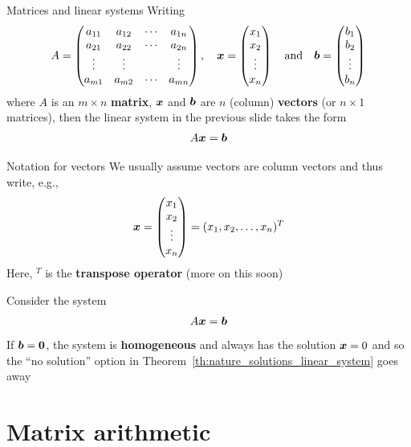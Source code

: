 \documentclass[aspectratio=169]{beamer}
\begin{document}
\begin{frame}{Matrices and linear systems}
Writing
$$
A=
\begin{pmatrix}
a_{11} & a_{12} & \cdots & a_{1n} \\
a_{21} & a_{22} & \cdots & a_{2n} \\
\vdots &\vdots & & \vdots \\
a_{m1} & a_{m2} & \cdots & a_{mn}
\end{pmatrix},\quad
\bm{x}=
\begin{pmatrix}
x_1\\ x_2 \\ \vdots \\ x_n
\end{pmatrix}
\quad\textrm{and}\quad
\bm{b}=
\begin{pmatrix}
b_1\\ b_2 \\ \vdots \\ b_n
\end{pmatrix}
$$
where $A$ is an $m\times n$ \textbf{matrix}, $\bm{x}$ and $\bm{b}$ are $n$ (column) \textbf{vectors} (or $n\times 1$ matrices), then the linear system in the previous slide takes the form
$$
A\bm{x}=\bm{b}  
$$
\end{frame}



\begin{frame}{Notation for vectors}
We usually assume vectors are column vectors and thus write, e.g.,
\[ 
\bm{x}=
\begin{pmatrix}
x_1\\ x_2 \\ \vdots \\ x_n
\end{pmatrix}
= (x_1,x_2,\ldots,x_n)^T
\]
Here, $^T$ is the \textbf{transpose operator} (more on this soon)
\end{frame}



\begin{frame}
Consider the system
\[
A\bm{x}=\bm{b}
\]
\vfill
If $\bb=\b0$, the system is \textbf{homogeneous} and always has the solution $\bm{x}=0$ and so the ``no solution'' option in Theorem~\ref{th:nature_solutions_linear_system} goes away
\end{frame}


\section{Matrix arithmetic}
\end{document}

